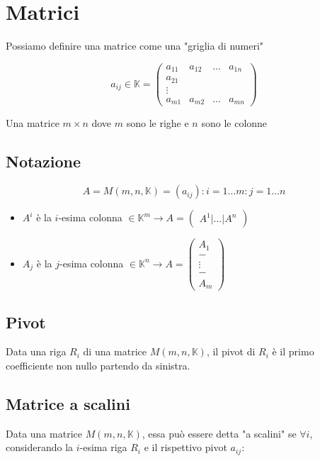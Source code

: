 \documentclass{article}
\begin{document}
\section{Matrici}

Possiamo definire una matrice come una "griglia di numeri"

$$
a_{ij} \in \mathbb{K} =
\begin{pmatrix}
a_{11} & a_{12} & \dots & a_{1n}\\
a_{21}\\
\vdots\\
a_{m1} & a_{m2} & \dots & a_{mn}
\end{pmatrix}
$$

\noindent
Una matrice $m \times n$ dove $m$ sono le righe e $n$ sono le colonne

\subsection{Notazione}

$$
A = M(m,n,\mathbb{K}) = (a_{ij}) : i = 1 \dots m : j = 1 \dots n
$$

\begin{itemize}
	\item $A^i$ è la $i$-esima colonna $\in \mathbb{K}^m \to A = \begin{pmatrix} A^1 | \dots | A^n \end{pmatrix}$
	\item $A_j$ è la $j$-esima colonna $\in \mathbb{K}^n \to A = \begin{pmatrix} A_1 \\ - \\ \vdots \\ - \\ A_m \end{pmatrix}$
\end{itemize}

\subsection{Pivot}

Data una riga $R_i$ di una matrice $M(m,n,\mathbb{K})$, il pivot di $R_i$ è il primo coefficiente non nullo partendo da sinistra.

\subsection{Matrice a scalini}

Data una matrice $M(m,n,\mathbb{K})$, essa può essere detta "a scalini" se $\forall i$, considerando la $i$-esima riga $R_i$ e il rispettivo pivot $a_{ij}$:
\end{document}
